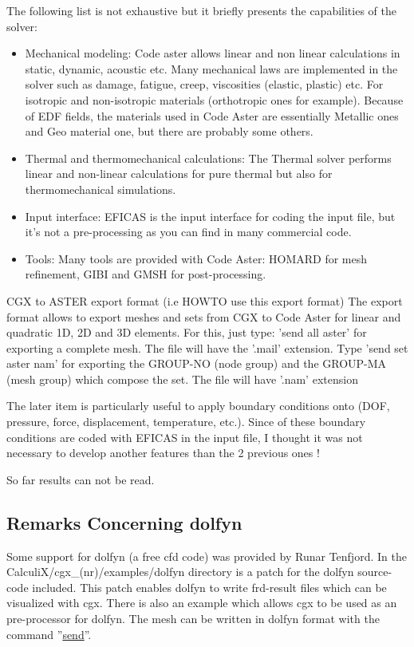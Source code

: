 \documentclass{article}
\providecommand{\htmlref}[2]{\hyperref[#2]{#1}}
\begin{document}
\begin{appendix}
The following list is not exhaustive but it briefly presents the capabilities of the solver:

\begin{itemize}

\item Mechanical modeling: 
Code aster allows linear and non linear calculations in static, dynamic, acoustic etc. Many mechanical laws are implemented in the solver such as damage, fatigue, creep, viscosities (elastic, plastic) etc. For isotropic and non-isotropic materials (orthotropic ones for example).
Because of EDF fields, the materials used in Code Aster are essentially Metallic ones and Geo material one, but there are probably some others.

\item Thermal and thermomechanical calculations: 
The Thermal solver performs linear and non-linear calculations for pure thermal but also for thermomechanical simulations.

\item Input interface: 
EFICAS is the input interface for coding the input file, but it's not a pre-processing as you can find in many commercial code.

\item Tools: 
Many tools are provided with Code Aster: HOMARD for mesh refinement, GIBI and GMSH for post-processing.
\end{itemize}

CGX to ASTER export format (i.e HOWTO use this export format)
The export format allows to export meshes and sets from CGX to Code Aster for linear and quadratic 1D, 2D and 3D elements. For this, just type: 'send all aster' for exporting a complete mesh. The file will have the '.mail' extension.
Type 'send set aster nam' for exporting the GROUP-NO (node group) and the GROUP-MA (mesh group) which compose the set. The file will have '.nam' extension

The later item is particularly useful to apply boundary conditions onto (DOF, pressure, force, displacement, temperature, etc.). Since of these boundary conditions are coded with EFICAS in the input file, I thought it was not necessary to develop another features than the 2 previous ones !

So far results can not be read.

\subsection{\label{Remarks Concerning dolfyn}Remarks Concerning dolfyn}
Some support for dolfyn (a free cfd code) was provided by Runar Tenfjord.
In the CalculiX/cgx\_(nr)/examples/dolfyn directory is a patch for the dolfyn source-code included. This patch enables dolfyn to write frd-result files which can be visualized with cgx. There is also an example which allows cgx to be used as an pre-processor for dolfyn. The mesh can be written in dolfyn format with the command ''\htmlref{send}{send}''.  


\end{appendix}
\end{document}
